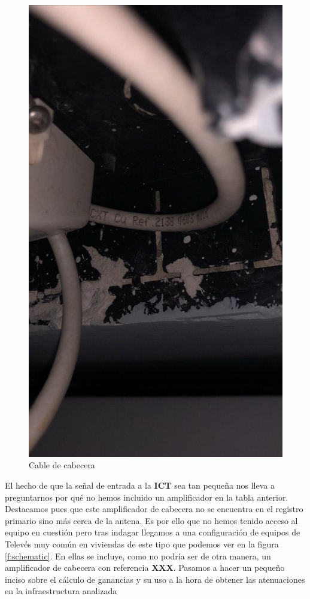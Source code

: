 \documentclass{article}[12 pt]
\begin{document}
		\begin{figure}
				\centering
				\includegraphics[scale=0.2, angle=90]{cable_cobre.jpg}
				\caption{Cable de cabecera}
				\label{f:coax}
		\end{figure}

		El hecho de que la señal de entrada a la \textbf{ICT} sea tan pequeña nos lleva a preguntarnos por qué no hemos incluido un amplificador en la tabla anterior. Destacamos pues que este amplificador de cabecera no se encuentra en el registro primario sino más cerca de la antena. Es por ello que no hemos tenido acceso al equipo en cuestión pero tras indagar llegamos a una configuración de equipos de Televés muy común en viviendas de este tipo que podemos ver en la figura \ref{f:schematic}. En ellas se incluye, como no podría ser de otra manera, un amplificador de cabecera con referencia \textbf{XXX}. Pasamos a hacer un pequeño inciso sobre el cálculo de ganancias y su uso a la hora de obtener las atenuaciones en la infraestructura analizada\\
\end{document}
